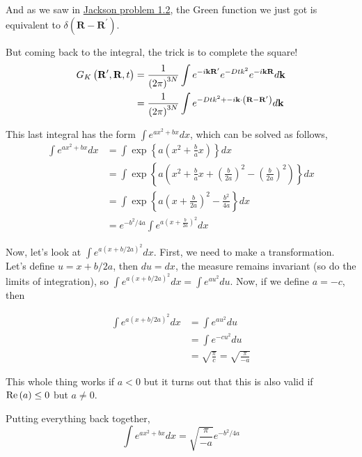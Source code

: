 And as we saw in \hyperref[jackson:problem-1.2]{Jackson problem 1.2}, the Green function we just got is equivalent to
$\delta\left(\mathbf{R} - \mathbf{R}^\prime\right)$.

But coming back to the integral, the trick is to complete the square!
\begin{align*}
G_K \left(\boldsymbol{\mathbf{R}}^\prime, \boldsymbol{\mathbf{R}}, t\right) &=
\frac{1}{\left(2\pi\right)^{3N}} \int e^{-i\boldsymbol{\mathbf{k}}\boldsymbol{\mathbf{R}}^\prime} e^{-Dtk^2} e^{-i\boldsymbol{\mathbf{k}}\boldsymbol{\mathbf{R}}} d\boldsymbol{\mathbf{k}} \\
&= \frac{1}{\left(2\pi\right)^{3N}} \int e^{-Dtk^2 + -i\boldsymbol{\mathbf{k}}\cdot\left(\boldsymbol{\mathbf{R}}-\boldsymbol{\mathbf{R}}^\prime\right)} d\mathbf{k}
\end{align*}

This last integral has the form $\int e^{ax^2 + bx} dx$, which can be solved as follows,
\begin{align*}
\int e^{ax^2 + bx} dx &= \int \exp\left\{ a\left(x^2 + \frac{b}{a}x\right) \right\} dx \\
&= \int \exp\left\{ a\left(x^2 + \frac{b}{a}x + \left(\frac{b}{2a}\right)^2 - \left(\frac{b}{2a}\right)^2 \right) \right\} dx \\
&= \int \exp\left\{ a\left(x + \frac{b}{2a}\right)^2 - \frac{b^2}{4a} \right\} dx \\
&= e^{-b^2/4a} \int e^{ a\left(x + \frac{b}{2a}\right)^2 } dx
\end{align*}

Now, let's look at $\int e^{ a\left(x + b/2a\right)^2 } dx$.
First, we need to make a transformation.
Let's define $u = x + b/2a$, then $du = dx$, the measure remains invariant (so do the limits of integration), so
$\int e^{ a\left(x + b/2a\right)^2 } dx = \int e^{ au^2 } du$.
Now, if we define $a = -c$, then 

\begin{align*}
\int e^{ a\left(x + b/2a\right)^2 } dx &= \int e^{ au^2 } du \\
&= \int e^{ -cu^2 } du \\
&= \sqrt{ \frac{\pi}{c} } = \sqrt{ \frac{\pi}{-a} } 
\end{align*}

This whole thing works if $a < 0$ but it turns out that this is also valid if $\operatorname{Re}{(a)} \leq 0$ but $a \neq 0$.

Putting everything back together,
$$
\int e^{ax^2 + bx} dx = \sqrt{ \frac{\pi}{-a} } e^{-b^2/4a}
$$

